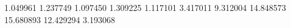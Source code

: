 1.049961
1.237749
1.097450
1.309225
1.117101
3.417011
9.312004
14.848573
15.680893
12.429294
3.193068

